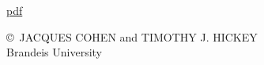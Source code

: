 \label{cohen}\secdown
\href{https://drive.google.com/file/d/0B0u4WeMjO894eHpLcTE2bWU0SjQ/view?usp=sharing}{pdf}

\copyright\ JACQUES COHEN and TIMOTHY J. HICKEY\\
Brandeis University
\bigskip







  
 
\secup
